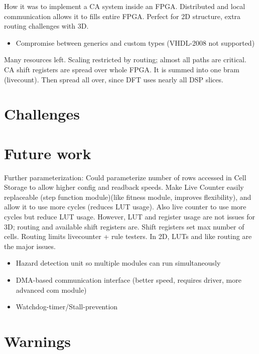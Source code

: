 \TODO
How it was to implement a CA system inside an FPGA.
Distributed and local communication allows it to fills entire FPGA.
Perfect for 2D structure, extra routing challenges with 3D.

\begin{itemize}
    \item Compromise between generics and custom types (VHDL-2008 not supported)
\end{itemize}

\TODO
Many resources left.
Scaling restricted by routing; almost all paths are critical.
CA shift registers are spread over whole FPGA.
It is summed into one bram (livecount).
Then spread all over, since DFT uses nearly all DSP slices.

\section{Challenges}
\label{sec:challenges}

\TODO

\section{Future work}

\TODO

Further parameterization:
Could parameterize number of rows accessed in Cell Storage to allow higher config and readback speeds.
Make Live Counter easily replaceable (step function module)(like fitness module, improves flexibility), and allow it to use more cycles (reduces LUT usage).
Also live counter to use more cycles but reduce LUT usage.
However, LUT and register usage are not issues for 3D; routing and available shift registers are.
Shift registers set max number of cells.
Routing limits livecounter + rule testers.
In 2D, LUTs and like routing are the major issues.

\begin{itemize}
    \item Hazard detection unit so multiple modules can run simultaneously
    \item DMA-based communication interface (better speed, requires driver, more advanced com module)
    \item Watchdog-timer/Stall-prevention
\end{itemize}

\section{Warnings}

